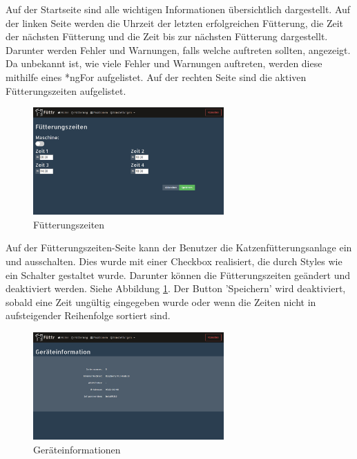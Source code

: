 Auf der Startseite sind alle wichtigen Informationen übersichtlich dargestellt. Auf der linken Seite werden die Uhrzeit der letzten erfolgreichen Fütterung, die Zeit der nächsten Fütterung und die Zeit bis zur nächsten Fütterung dargestellt. Darunter werden Fehler und Warnungen, falls welche auftreten sollten, angezeigt. Da unbekannt ist, wie viele Fehler und Warnungen auftreten, werden diese mithilfe eines *ngFor aufgelistet. Auf der rechten Seite sind die aktiven Fütterungszeiten aufgelistet. \\

\begin{figure}
\vspace{-10pt}
  \begin{center}
    \includegraphics[width=0.65\textwidth]{Bilder/Greistorfer/Fuetterungszeiten}
  \end{center}
  \caption{Fütterungszeiten}
  \label{Fütterungszeiten}
  \vspace{-10pt}
\end{figure}

Auf der Fütterungszeiten-Seite kann der Benutzer die Katzenfütterungsanlage ein und ausschalten. Dies wurde mit einer Checkbox realisiert, die durch Styles wie ein Schalter gestaltet wurde. Darunter können die Fütterungszeiten geändert und deaktiviert werden. Siehe Abbildung \ref{Fütterungszeiten}. Der Button 'Speichern' wird deaktiviert, sobald eine Zeit ungültig eingegeben wurde oder wenn die Zeiten nicht in aufsteigender Reihenfolge sortiert sind. \newpage

\begin{figure}
\vspace{-10pt}
  \begin{center}
    \includegraphics[width=0.65\textwidth]{Bilder/Greistorfer/Gerateinformation}
  \end{center}
  \caption{Geräteinformationen}
  \label{Geräteinformationen}
  \vspace{-60pt}
\end{figure}

